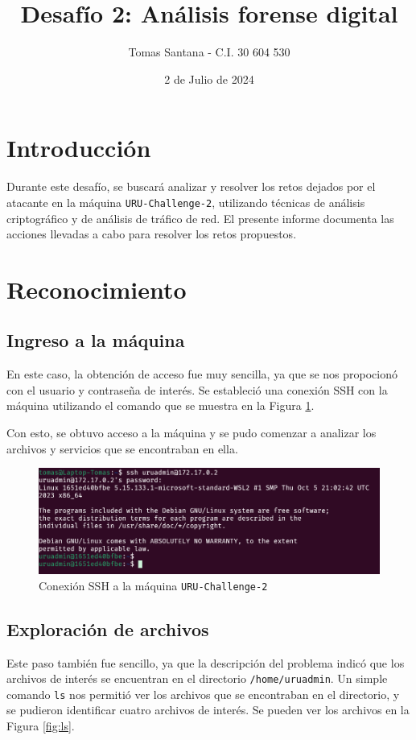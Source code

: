 \documentclass{article}
\title{Desafío 2: Análisis forense digital} %
\author{Tomas Santana - C.I. 30 604 530} %
\date{2 de Julio de 2024} %
\begin{document}
\maketitle
\section{Introducción}
Durante este desafío, se buscará analizar y resolver los retos dejados por el atacante en la máquina \texttt{URU-Challenge-2}, utilizando técnicas de análisis criptográfico y de análisis de tráfico de red. El presente informe documenta las acciones llevadas a cabo para resolver los retos propuestos.

\section{Reconocimiento}
\subsection{Ingreso a la máquina}

En este caso, la obtención de acceso fue muy sencilla, ya que se nos propocionó con el usuario y contraseña de interés. Se estableció una conexión SSH con la máquina utilizando el comando que se muestra en la Figura \ref{fig:ssh}.

Con esto, se obtuvo acceso a la máquina y se pudo comenzar a analizar los archivos y servicios que se encontraban en ella.

\begin{figure}[ht!]
  \includegraphics[width=\textwidth]{ssh.png}
  \caption{Conexión SSH a la máquina \texttt{URU-Challenge-2}}
  \label{fig:ssh}
\end{figure}

\subsection{Exploración de archivos}

Este paso también fue sencillo, ya que la descripción del problema indicó que los archivos de interés se encuentran en el directorio \texttt{/home/uruadmin}. Un simple comando \texttt{ls} nos permitió ver los archivos que se encontraban en el directorio, y se pudieron identificar cuatro archivos de interés. Se pueden ver los archivos en la Figura \ref{fig:ls}.
\end{document}
